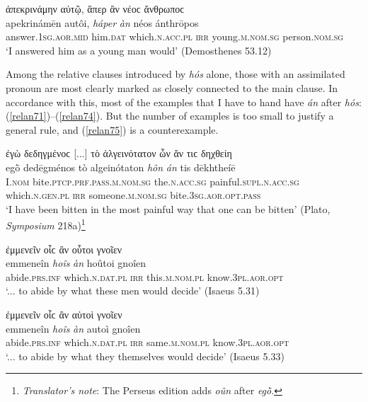\newpage
\begin{exe}
\ex ἀπεκρινάμην αὐτῷ, ἅπερ ἂν νέοϲ ἄνθρωποϲ\\
\gll apekrinámēn autôi, \emph{háper} \emph{àn} néos ánthrōpos\\
answer.\textsc{1sg.aor.mid} him.\textsc{dat} which.\textsc{n.acc.pl} \textsc{irr} young.\textsc{m.nom.sg} person.\textsc{nom.sg}\\
\trans `I answered him as a young man would' (Demosthenes 53.12)
\label{relan70}
\end{exe}

Among the relative clauses introduced by \emph{hós} alone, those with an assimilated pronoun are most clearly marked as closely connected to the main clause. In accordance with this, most of the examples that I have to hand have \emph{án} after \emph{hós}: (\ref{relan71})--(\ref{relan74}). But the number of examples is too small to justify a general rule, and (\ref{relan75}) is a counterexample.

\begin{exe}
\ex ἐγὼ δεδηγμένοϲ {[}...{]} τὸ ἀλγεινότατον ὧν ἄν τιϲ δηχθείη\\
\gll egṑ dedēgménos tò algeinótaton \emph{hôn} \emph{án} tis dēkhtheíē\\
I.\textsc{nom} bite.\textsc{ptcp.prf.pass.m.nom.sg} the.\textsc{n.acc.sg} painful.\textsc{supl.n.acc.sg} which.\textsc{n.gen.pl} \textsc{irr} someone.\textsc{m.nom.sg} bite.\textsc{3sg.aor.opt.pass}\\
\trans `I have been bitten in the most painful way that one can be bitten' (Plato, \textit{Symposium} 218a)\footnote{\emph{Translator's note}: The Perseus edition adds \textit{oûn} after \textit{egṑ}.}
\label{relan71}
\end{exe}

\begin{exe}
\ex ἐμμενεῖν οἷϲ ἂν οὗτοι γνοῖεν\\
\gll emmeneîn \emph{hoîs} \emph{àn} hoûtoi gnoîen\\
abide.\textsc{prs.inf} which.\textsc{n.dat.pl} \textsc{irr} this.\textsc{m.nom.pl} know.\textsc{3pl.aor.opt}\\
\trans `... to abide by what these men would decide' (Isaeus 5.31)
\label{relan72}
\end{exe}

\begin{exe}
\ex ἐμμενεῖν οἷϲ ἂν αὐτοὶ γνοῖεν\\
\gll emmeneîn \emph{hoîs} \emph{àn} autoì gnoîen\\
abide.\textsc{prs.inf} which.\textsc{n.dat.pl} \textsc{irr} same.\textsc{m.nom.pl} know.\textsc{3pl.aor.opt}\\
\trans `... to abide by what they themselves would decide' (Isaeus 5.33)
\label{relan73}
\end{exe}

